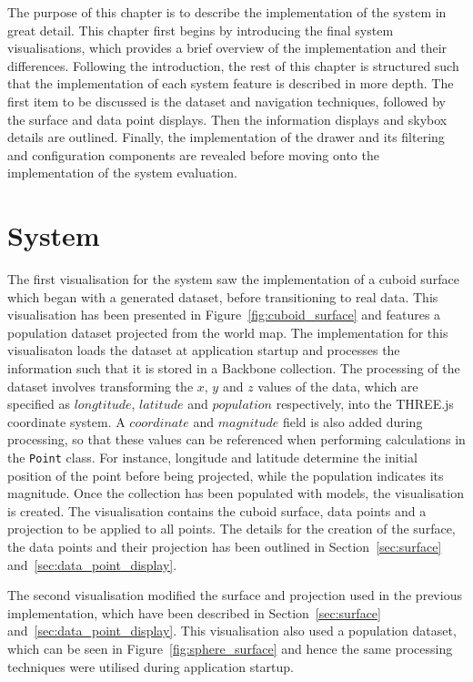 
The purpose of this chapter is to describe the implementation of the system in great detail. This chapter first begins by introducing the final system visualisations, which provides a brief overview of the implementation and their differences. Following the introduction, the rest of this chapter is structured such that the implementation of each system feature is described in more depth. The first item to be discussed is the dataset and navigation techniques, followed by the surface and data point displays. Then the information displays and skybox details are outlined. Finally, the implementation of the drawer and its filtering and configuration components are revealed before moving onto the implementation of the system evaluation.

\section{System} {
\label{sec:system}

	The first visualisation for the system saw the implementation of a cuboid surface which began with a generated dataset, before transitioning to real data. This visualisation has been presented in Figure~\ref{fig:cuboid_surface} and features a population dataset projected from the world map. The implementation for this visualisaton loads the dataset at application startup and processes the information such that it is stored in a Backbone collection. The processing of the dataset involves transforming the $x$, $y$ and $z$ values of the data, which are specified as $longtitude$, $latitude$ and $population$ respectively, into the THREE.js coordinate system. A $coordinate$ and $magnitude$ field is also added during processing, so that these values can be referenced when performing calculations in the \texttt{Point} class. For instance, longitude and latitude determine the initial position of the point before being projected, while the population indicates its magnitude. Once the collection has been populated with models, the visualisation is created. The visualisation contains the cuboid surface, data points and a projection to be applied to all points. The details for the creation of the surface, the data points and their projection has been outlined in Section~\ref{sec:surface} and~\ref{sec:data_point_display}.

	

	The second visualisation modified the surface and projection used in the previous implementation, which have been described in Section~\ref{sec:surface} and~\ref{sec:data_point_display}. This visualisation also used a population dataset, which can be seen in Figure~\ref{fig:sphere_surface} and hence the same processing techniques were utilised during application startup.

}
